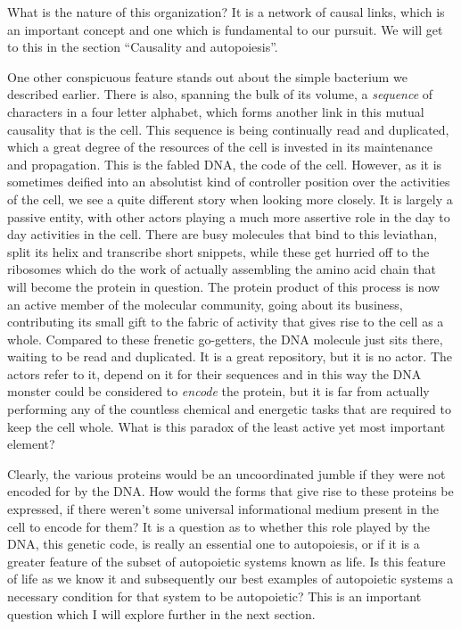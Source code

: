 \documentclass[12pt]{scrartcl}
\begin{document}
What is the nature of this organization?  It is a network of causal links, which is an important concept and one which is fundamental to our pursuit.  We will get to this in the section ``Causality and autopoiesis''.

One other conspicuous feature stands out about the simple bacterium we described earlier.  There is also, spanning the bulk of its volume, a \emph{sequence} of characters in a four letter alphabet, which forms another link in this mutual causality that is the cell.  This sequence is being continually read and duplicated, which a great degree of the resources of the cell is invested in its maintenance and propagation.  This is the fabled DNA, the code of the cell.  However, as it is sometimes deified into an absolutist kind of controller position over the activities of the cell, we see a quite different story when looking more closely.\cite{Ho}   It is largely a passive entity, with other actors playing a much more assertive role in the day to day activities in the cell.  There are busy molecules that bind to this leviathan, split its helix and transcribe short snippets, while these get hurried off to the ribosomes which do the work of actually assembling the amino acid chain that will become the protein in question.   The protein product of this process is now an active member of the molecular community, going about its business, contributing its small gift to the fabric of activity that gives rise to the cell as a whole.  Compared to these frenetic go-getters, the DNA molecule just sits there, waiting to be read and duplicated.  It is a great repository, but it is no actor.  The actors refer to it, depend on it for their sequences and in this way the DNA monster could be considered to \emph{encode} the protein, but it is far from actually performing any of the countless chemical and energetic tasks that are required to keep the cell whole.  What is this paradox of the least active yet most important element?  

Clearly, the various proteins would be an uncoordinated jumble if they were not encoded for by the DNA.  How would the forms that give rise to these proteins be expressed, if there weren't some universal informational medium present in the cell to encode for them?  It is a question as to whether this role played by the DNA, this genetic code, is really an essential one to autopoiesis, or if it is a greater feature of the subset of autopoietic systems known as life.  Is this feature of life as we know it and subsequently our best examples of autopoietic systems a necessary condition for that system to be autopoietic?  This is an important question which I will explore further in the next section.
\end{document}

